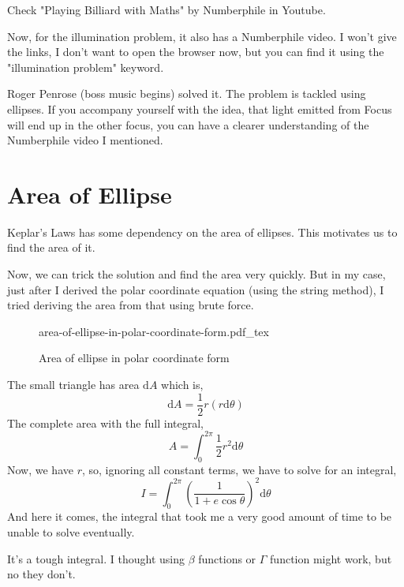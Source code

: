 \documentclass[12pt,a4paper]{article}
\newcommand{\incfig}[1]{%
    \def\svgwidth{0.7\columnwidth}
    {#1.pdf_tex}
}
\begin{document}
Check "Playing Billiard with Maths" by Numberphile in Youtube. 

Now, for the illumination problem, it also has a Numberphile video. I won't give the links, I don't want to open the browser now, but you can find it using the "illumination problem" keyword. 

Roger Penrose (boss music begins) solved it. The problem is tackled using ellipses. If you accompany yourself with the idea, that light emitted from Focus will end up in the other focus, you can have a clearer understanding of the Numberphile video I mentioned.
















\newpage

\section{ Area of Ellipse }
Keplar's Laws has some dependency on the area of ellipses. This motivates us to find the area of it.

Now, we can trick the solution and find the area very quickly. But in my case, just after I derived the polar coordinate equation (using the string method), I tried deriving the area from that using brute force. 

\begin{figure}[ht!]
    \centering
    \incfig{area-of-ellipse-in-polar-coordinate-form}
    \caption{Area of ellipse in polar coordinate form}
    \label{fig:area-of-ellipse-in-polar-coordinate-form}
\end{figure}

The small triangle has area $\mathrm{d} A$ which is,
\[ 
    \mathrm{d} A = \frac{1}{2} r \left( r \mathrm{d} \theta \right) 
\]
The complete area with the full integral,
\[ 
A=\int_{0}^{2 \pi} \frac{1}{2} r^2 \mathrm{d} \theta 
\]
Now, we have $r$, so, ignoring all constant terms, we have to solve for an integral,
\[ 
    I = \int_{0 }^{2\pi} \left( \frac{1}{1 + e \cos \theta} \right) ^2 \mathrm{d} \theta 
\]
And here it comes, the integral that took me a very good amount of time to be unable to solve eventually. 

It's a tough integral. I thought using $\beta$ functions or $\Gamma$ function might work, but no they don't.
\end{document}

